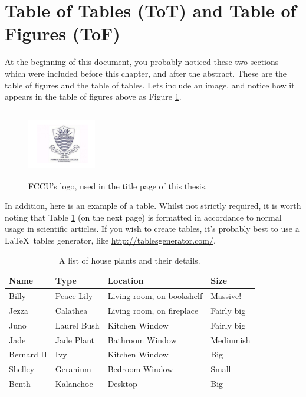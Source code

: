 \section{Table of Tables (ToT) and Table of Figures (ToF)}
At the beginning of this document, you probably noticed these two sections which were included before this chapter, and after the abstract. These are the table of figures and the table of tables. Lets include an image, and notice how it appears in the table of figures above as Figure \ref{fig:tof-example}.

\begin{figure}[htb]
    \centering
    \includegraphics[width=3cm, height=3cm]{logo.pdf}
    \caption{FCCU's logo, used in the title page of this thesis.}
    \label{fig:tof-example}
\end{figure}

In addition, here is an example of a table. Whilst not strictly required, it is worth noting that Table \ref{tbl:example-table} (on the next page) is formatted in accordance to normal usage in scientific articles. If you wish to create tables, it's probably best to use a \LaTeX~tables generator, like \url{http://tablesgenerator.com/}.

\begin{table}[htb]
\centering
\caption{A list of house plants and their details.}
\begin{tabular}{l|l|l|l}
\textbf{Name} & \textbf{Type} & \textbf{Location}         & \textbf{Size} \\
\hline\hline
Billy         & Peace Lily    & Living room, on bookshelf & Massive!      \\
Jezza         & Calathea      & Living room, on fireplace & Fairly big    \\
Juno          & Laurel Bush   & Kitchen Window            & Fairly big    \\
Jade          & Jade Plant    & Bathroom Window           & Mediumish     \\
Bernard II    & Ivy           & Kitchen Window            & Big           \\
Shelley       & Geranium      & Bedroom Window            & Small        \\
Benth         & Kalanchoe     & Desktop                   & Big
\end{tabular}
\label{tbl:example-table}
\end{table}

